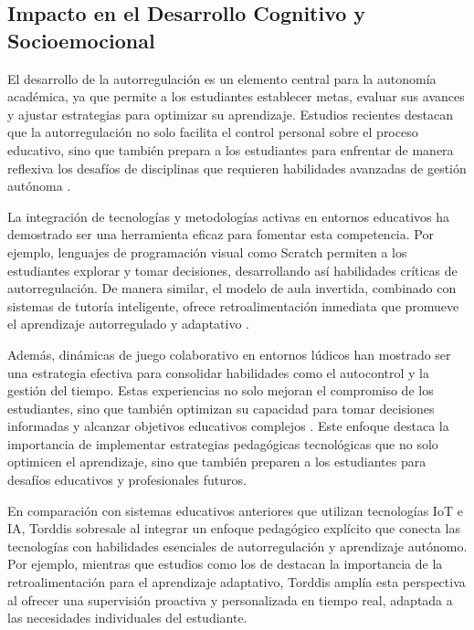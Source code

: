 \documentclass[a4paper,fleqn]{cas-sc}
\begin{document}
		\subsection{Impacto en el Desarrollo Cognitivo y Socioemocional}
			El desarrollo de la autorregulación es un elemento central para la autonomía académica, ya que permite a los estudiantes establecer metas, evaluar sus avances y ajustar estrategias para optimizar su aprendizaje. Estudios recientes destacan que la autorregulación no solo facilita el control personal sobre el proceso educativo, sino que también prepara a los estudiantes para enfrentar de manera reflexiva los desafíos de disciplinas que requieren habilidades avanzadas de gestión autónoma \citep{Taber2024Developing}.
		
			La integración de tecnologías y metodologías activas en entornos educativos ha demostrado ser una herramienta eficaz para fomentar esta competencia. Por ejemplo, lenguajes de programación visual como Scratch permiten a los estudiantes explorar y tomar decisiones, desarrollando así habilidades críticas de autorregulación. De manera similar, el modelo de aula invertida, combinado con sistemas de tutoría inteligente, ofrece retroalimentación inmediata que promueve el aprendizaje autorregulado y adaptativo \citep{Mohamed2018Implementing}.
		
			Además, dinámicas de juego colaborativo en entornos lúdicos han mostrado ser una estrategia efectiva para consolidar habilidades como el autocontrol y la gestión del tiempo. Estas experiencias no solo mejoran el compromiso de los estudiantes, sino que también optimizan su capacidad para tomar decisiones informadas y alcanzar objetivos educativos complejos \citep{Echeverria2011AFramework}. Este enfoque destaca la importancia de implementar estrategias pedagógicas tecnológicas que no solo optimicen el aprendizaje, sino que también preparen a los estudiantes para desafíos educativos y profesionales futuros.
			
			En comparación con sistemas educativos anteriores que utilizan tecnologías IoT e IA, Torddis sobresale al integrar un enfoque pedagógico explícito que conecta las tecnologías con habilidades esenciales de autorregulación y aprendizaje autónomo. Por ejemplo, mientras que estudios como los de \cite{Bordel2024Pilot,Deng2024Does,Falzetti2024Promoting} destacan la importancia de la retroalimentación para el aprendizaje adaptativo, Torddis amplía esta perspectiva al ofrecer una supervisión proactiva y personalizada en tiempo real, adaptada a las necesidades individuales del estudiante.
			
\end{document}
